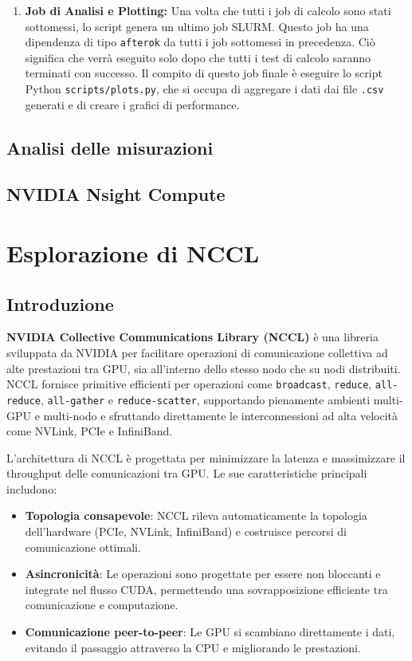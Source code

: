 \documentclass[a4paper]{article}
\begin{document}
\begin{enumerate}
    \item \textbf{Job di Analisi e Plotting:} Una volta che tutti i job di calcolo sono stati sottomessi, lo script genera un ultimo job SLURM. Questo job ha una dipendenza di tipo \texttt{afterok} da tutti i job sottomessi in precedenza. Ciò significa che verrà eseguito solo dopo che tutti i test di calcolo saranno terminati con successo. Il compito di questo job finale è eseguire lo script Python \texttt{scripts/plots.py}, che si occupa di aggregare i dati dai file \texttt{.csv} generati e di creare i grafici di performance.
\end{enumerate}

\subsection{Analisi delle misurazioni}

\subsection{NVIDIA Nsight Compute}

\section{Esplorazione di NCCL}

\subsection{Introduzione}

\textbf{NVIDIA Collective Communications Library (NCCL)} è una libreria sviluppata da NVIDIA per facilitare operazioni di comunicazione collettiva ad alte prestazioni tra GPU, sia all'interno dello stesso nodo che su nodi distribuiti. NCCL fornisce primitive efficienti per operazioni come \texttt{broadcast}, \texttt{reduce}, \texttt{all-reduce}, \texttt{all-gather} e \texttt{reduce-scatter}, supportando pienamente ambienti multi-GPU e multi-nodo e sfruttando direttamente le interconnessioni ad alta velocità come NVLink, PCIe e InfiniBand.

L'architettura di NCCL è progettata per minimizzare la latenza e massimizzare il throughput delle comunicazioni tra GPU. Le sue caratteristiche principali includono:

\begin{itemize}
  \item \textbf{Topologia consapevole}: NCCL rileva automaticamente la topologia dell’hardware (PCIe, NVLink, InfiniBand) e costruisce percorsi di comunicazione ottimali.
  \item \textbf{Asincronicità}: Le operazioni sono progettate per essere non bloccanti e integrate nel flusso CUDA, permettendo una sovrapposizione efficiente tra comunicazione e computazione.
  \item \textbf{Comunicazione peer-to-peer}: Le GPU si scambiano direttamente i dati, evitando il passaggio attraverso la CPU e migliorando le prestazioni.
\end{itemize}
\end{document}
